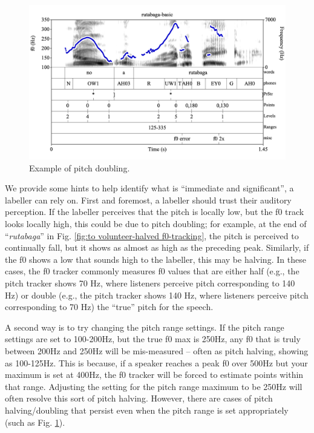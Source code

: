 \documentclass[11pt, twoside]{memoir}
\def\langtext#1{\textit{#1}}
\begin{document}
\begin{figure}[H]
\centering
%
\includegraphics[width=.875\linewidth]{Contours-rutabaga-basic.png}
%
\caption{Example of pitch doubling.%
\label{fig:rutabaga f0-tracking}%
%
}
\end{figure}

We provide some hints to help identify what is “immediate and significant”, a labeller can rely on.
First and foremost, a labeller should trust their auditory perception. If the labeller perceives that the pitch is locally low, but the f0 track looks locally high, this could be due to pitch doubling; for example, at the end of “\langtext{rutabaga}” in Fig. \ref{fig:to volunteer-halved f0-tracking}, the pitch is perceived to continually fall, but it shows as almost as high as the preceding peak. Similarly, if the f0 shows a low that sounds high to the labeller, this may be halving. In these cases, the f0 tracker commonly measures f0 values that are either half (e.g., the pitch tracker shows 70 Hz, where listeners perceive pitch corresponding to 140 Hz) or double (e.g., the pitch tracker shows 140 Hz, where listeners perceive pitch corresponding to 70 Hz) the “true” pitch for the speech.

A second way is to try changing the pitch range settings. If the pitch range settings are set to 100-200Hz, but the true f0 max is 250Hz, any f0 that is truly between 200Hz and 250Hz will be mis-measured – often as pitch halving, showing as 100-125Hz. This is because, if a speaker reaches a peak f0 over 500Hz but your maximum is set at 400Hz, the f0 tracker will be forced to estimate points within that range. Adjusting the setting for the pitch range maximum to be 250Hz will often resolve this sort of pitch halving. However, there are cases of pitch halving\slash doubling that persist even when the pitch range is set appropriately (such as Fig. \ref{fig:rutabaga f0-tracking}).
\end{document}

